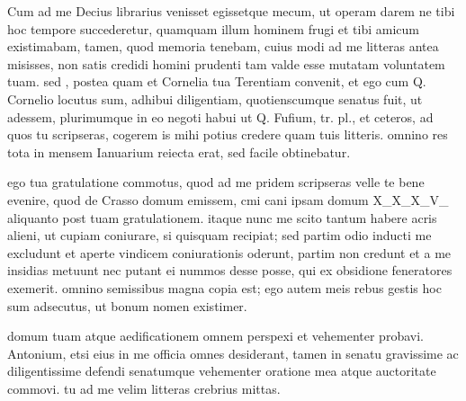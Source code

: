 


 Cum ad me Decius librarius venisset egissetque mecum, ut operam darem ne tibi hoc tempore succederetur, quamquam illum hominem frugi et tibi amicum existimabam, tamen, quod memoria tenebam, cuius modi ad me litteras antea misisses, non satis credidi homini prudenti tam valde esse mutatam voluntatem tuam. sed , postea quam et Cornelia tua Terentiam convenit, et ego cum Q. Cornelio locutus sum, adhibui diligentiam, quotienscumque senatus fuit, ut adessem, plurimumque in eo negoti habui ut Q. Fufium, tr. pl., et ceteros, ad quos tu scripseras, cogerem is mihi potius credere quam tuis litteris. omnino res tota in mensem Ianuarium reiecta erat, sed facile obtinebatur.

 ego tua gratulatione commotus, quod ad me pridem scripseras velle te bene evenire, quod de Crasso domum emissem, cmi cani ipsam domum X_X_X_V_ aliquanto post tuam gratulationem. itaque nunc me scito tantum habere acris alieni, ut cupiam coniurare, si quisquam recipiat; sed partim odio inducti me excludunt et aperte vindicem coniurationis oderunt, partim non credunt et a me insidias metuunt nec putant ei nummos desse posse, qui ex obsidione feneratores exemerit. omnino semissibus magna copia est; ego autem meis rebus gestis hoc sum adsecutus, ut bonum nomen existimer.

 domum tuam atque aedificationem omnem perspexi et vehementer probavi. Antonium, etsi eius in me officia omnes desiderant, tamen in senatu gravissime ac diligentissime defendi senatumque vehementer oratione mea atque auctoritate commovi. tu ad me velim litteras crebrius mittas.
